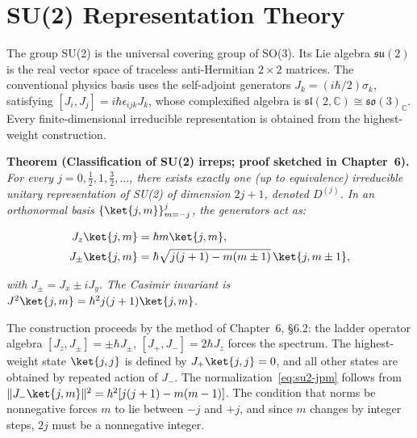 \section{SU(2) Representation Theory}
\label{sec:appendix-su2-reps}

The group SU(2) is the universal covering group of SO(3). Its Lie algebra $\mathfrak{su}(2)$ is the real vector space of traceless anti-Hermitian $2 \times 2$ matrices. The conventional physics basis uses the self-adjoint generators $J_k = (i\hbar/2)\sigma_k$, satisfying $[J_i, J_j] = i\hbar\epsilon_{ijk}J_k$, whose complexified algebra is $\mathfrak{sl}(2,\mathbb{C}) \cong \mathfrak{so}(3)_{\mathbb{C}}$. Every finite-dimensional irreducible representation is obtained from the highest-weight construction.

\medskip\noindent\textbf{Theorem (Classification of SU(2) irreps; proof sketched in Chapter~6).} \emph{For every $j = 0, \tfrac12, 1, \tfrac32, \ldots$, there exists exactly one (up to equivalence) irreducible unitary representation of SU(2) of dimension $2j+1$, denoted $D^{(j)}$. In an orthonormal basis $\{\ket{j,m}\}_{m=-j}^j$, the generators act as:}
\begin{linenomath}
    \begin{align}
        J_z \ket{j,m} &= \hbar m \ket{j,m}, \label{eq:su2-jz} \\
        J_\pm \ket{j,m} &= \hbar\sqrt{j(j+1) - m(m \pm 1)}\,\ket{j,m \pm 1}, \label{eq:su2-jpm}
    \end{align}
\end{linenomath}
\emph{with $J_\pm = J_x \pm iJ_y$. The Casimir invariant is $J^2 \ket{j,m} = \hbar^2 j(j+1) \ket{j,m}$.}

The construction proceeds by the method of Chapter~6, §6.2: the ladder operator algebra $[J_z, J_\pm] = \pm\hbar J_\pm$, $[J_+, J_-] = 2\hbar J_z$ forces the spectrum. The highest-weight state $\ket{j,j}$ is defined by $J_+ \ket{j,j} = 0$, and all other states are obtained by repeated action of $J_-$. The normalization~\eqref{eq:su2-jpm} follows from $\|J_-\ket{j,m}\|^2 = \hbar^2[j(j+1) - m(m-1)]$. The condition that norms be nonnegative forces $m$ to lie between $-j$ and $+j$, and since $m$ changes by integer steps, $2j$ must be a nonnegative integer.


